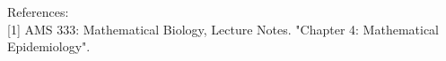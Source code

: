 \documentclass[12pt]{article}
\begin{document}
 
 \vspace{1cm}

%
%

\begin{flushleft}
References:\\


[1] AMS 333: Mathematical Biology, Lecture Notes. "Chapter 4: Mathematical Epidemiology".


\end{flushleft}
\end{document}
